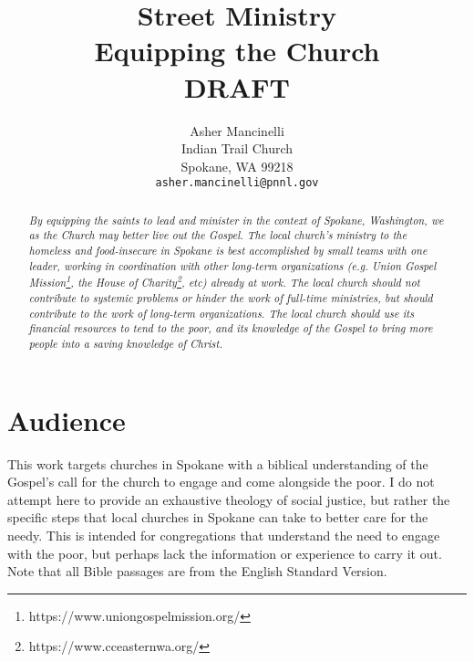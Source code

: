 \documentclass[12pt]{article}
\title{Street Ministry \\
        \large Equipping the Church \\
        \large DRAFT}
\author{Asher Mancinelli \\
        Indian Trail Church \\
        Spokane, WA 99218 \\
        \texttt{asher.mancinelli@pnnl.gov} \\ }
\begin{document}
\maketitle

\begin{abstract}
    \textit{
    By equipping the saints to lead and minister in the context of Spokane, Washington, we as the Church may better live out the Gospel.
    The local church's ministry to the homeless and food-insecure in Spokane is best accomplished by small teams with one leader, working in coordination with other long-term organizations (e.g. Union Gospel Mission\footnote{https://www.uniongospelmission.org/}, the House of Charity\footnote{https://www.cceasternwa.org/}, etc) already at work.
    The local church should not contribute to systemic problems or hinder the work of full-time ministries, but should contribute to the work of long-term organizations.
    The local church should use its financial resources to tend to the poor, and its knowledge of the Gospel to bring more people into a saving knowledge of Christ.
    }
\end{abstract}


\clearpage

\section{Audience}

    This work targets churches in Spokane with a biblical understanding of the Gospel's call for the church to engage and come alongside the poor.
    I do not attempt here to provide an exhaustive theology of social justice, but rather the specific steps that local churches in Spokane can take to better care for the needy.
    This is intended for congregations that understand the need to engage with the poor, but perhaps lack the information or experience to carry it out.
    Note that all Bible passages are from the English Standard Version\cite{esv2016}.
\end{document}
